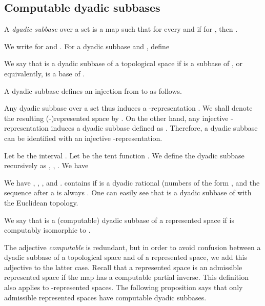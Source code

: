 \documentclass{eptcs-modified}
\begin{document}
\subsection{Computable dyadic subbases}

\begin{definition}\rm\label{def:dyadicsubbase}
A \emph{dyadic subbase} over a set  is
a map  such that  for every  and if  for , then .
\end{definition}

We write  for  and .
For a dyadic subbase  and , define

We say that  is a dyadic subbase of a topological space  if  is a subbase of , or equivalently,
 is a base of .

A dyadic subbase  defines an injection
 from  to  as follows.

Any dyadic subbase  over a set  thus induces a -representation . We shall denote the resulting (-)represented space by .
On the other hand, any injective -representation  induces a dyadic subbase 
  defined as . Therefore, a dyadic subbase can be identified with an injective -representation.

\newcommand{\I}{{\mathbb I}}
\begin{example}\label{ex:gray} Let  be the interval .  Let  be the tent function
.
We define  the dyadic subbase  recursively as , ,
.  We have

We have
,  ,
, and .
 contains  if  is a dyadic rational (numbers of the form , and the sequence after a  is always .
One can easily see that  is a dyadic subbase of  with the Euclidean topology.

\end{example}




\begin{definition}\label{def:dyadicsubbase3}
We say that  is a (computable) dyadic subbase of a represented space  if
 is computably isomorphic to .
\end{definition}

The adjective \emph{computable} is redundant, but in order to avoid confusion between a dyadic subbase of a topological space and of a represented space, we add this adjective to the latter case.
Recall that a represented space  is an admissible represented space if
the map  has a computable partial inverse.
This definition also applies to -represented spaces.
The following proposition says that only admissible represented spaces have computable dyadic subbases.
\end{document}
